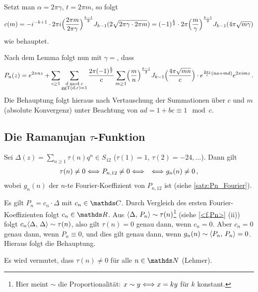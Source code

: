\begin{bewe}
\begin{bewe}
Setzt man $\alpha = 2\pi \gamma$, $t = 2\pi m$, so folgt
\[
c(m) = -i^{-k+1} \cdot 2\pi i \Bigl( \frac{2\pi m}{2\pi \gamma}\Bigr)^{\frac{k-1}{2}} J_{k-1} (2\sqrt{2\pi \gamma \cdot 2 \pi m}) = (-1)^{\frac{k}{2}} \cdot 2\pi \Bigl(\frac{m}{\gamma}\Bigr)^{\frac{k-1}{2}} J_{k-1} (4\pi \sqrt{m\gamma})
\]
wie behauptet.


\end{bewe}

Nach dem Lemma folgt nun mit $\gamma = $, dass
\[
P_n(z) = e^{2\pi nz} + \sum_{c\geq1} \sum_{\substack{d \bmod c\\ \operatorname{ggT}(d,c) = 1}} \frac{2\pi (-1)^{\frac{k}{2}}}{c} \sum_{m\geq 1} \Bigl(\frac{m}{n}\Bigr)^{\frac{k-1}{2}} J_{k-1} \Bigl(\frac{4\pi \sqrt{mn}}{c}\Bigr) \cdot e^{\frac{2\pi i}{c}(na+md)} e^{2\pi imz}
\,.
\]
Die Behauptung folgt hieraus nach Vertauschung der Summationen über $c$ und $m$ (absolute Konvergenz) unter Beachtung von $ad = 1 + bc \equiv 1 \mod c$.

\end{bewe}

\subsection[Die Ramanujan \texorpdfstring{$\tau$}{tau}-Funktion]{Die Ramanujan {\boldmath $\tau$}-Funktion}

\begin{satz}
Sei $\Delta(z) = \sum_{n \geq 1} \tau(n) q^n \in S_{12}$ ($\tau(1) = 1$, $\tau(2) = -24, \ldots $).
Dann gilt
\begin{align*}
\tau(n) \not= 0 &\Longleftrightarrow P_{n,12} \not= 0 \Longleftrightarrow &\Longleftrightarrow g_n(n) \not= 0
\,,
\end{align*}
wobei $g_n(n)$ der $n$-te Fourier-Koeffizient von $P_{n,12}$ ist (siehe \autoref{satz:Pn_Fourier}).
\end{satz}
\begin{bewe}
Es gilt $P_n = c_n \cdot \Delta$ mit $c_n \in \CC$.
Durch Vergleich des ersten Fourier-Koeffizienten folgt $c_n \in \RR$.
Aus $\scalarprd{\Delta}{P_n} \sim \tau(n)$\footnote{Hier meint $\sim$ die Proportionalität: $x \sim y \Longleftrightarrow x = ky$ für $k$ konstant.} (siehe \autoref{<f,Pn>} (ii)) folgt $c_n \scalarprd \Delta \Delta \sim \tau(n)$, also gilt $\tau(n) = 0$ genau dann, wenn $c_n = 0$. Aber $c_n = 0$ genau dann, wenn $P_n \equiv 0$, und dies gilt genau dann, wenn $g_n(n) \sim \scalarprd{P_n}{P_n} = 0$.
Hieraus folgt die Behauptung.
\end{bewe}

\begin{beme}
Es wird vermutet, dass $\tau(n) \not= 0$ für alle $n\in\NN$ (Lehmer).
\end{beme}

